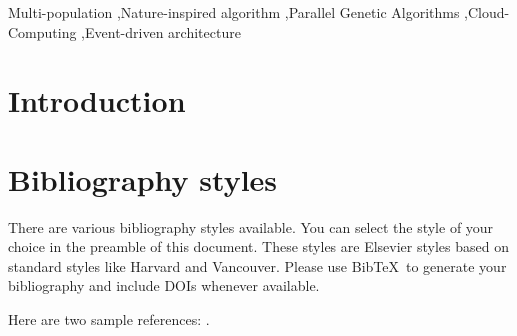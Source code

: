 \documentclass[review]{elsarticle}
\begin{document}
\begin{frontmatter}
\begin{keyword}
Multi-population \sep Nature-inspired algorithm \sep Parallel Genetic Algorithms \sep Cloud-Computing
\sep Event-driven architecture 
\end{keyword}

\end{frontmatter}

\linenumbers

\section{Introduction}

\section{Bibliography styles}

There are various bibliography styles available. You can select the style of your choice in the preamble of this document. These styles are Elsevier styles based on standard styles like Harvard and Vancouver. Please use Bib\TeX\ to generate your bibliography and include DOIs whenever available.

Here are two sample references: \cite{Feynman1963118,Dirac1953888}.



\end{document}
